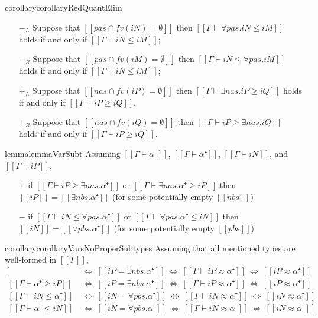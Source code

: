 \begin{restatable}{corollary}{corollaryRedQuantElim}
    \label{corollary:red-quant-elim}
    \hfill
    \begin{itemize}
        \item [$-_{L}$] Suppose that $[[ {pas} ∩ fv(iN) = ∅]]$ then 
            $[[Γ ⊢ ∀pas.iN ≤ iM]]$ holds if and only if $[[Γ ⊢ iN ≤ iM]]$;
        \item [$-_{R}$] Suppose that $[[ {pas} ∩ fv(iM) = ∅]]$ then 
            $[[Γ ⊢ iN ≤ ∀pas.iM]]$ holds if and only if $[[Γ ⊢ iN ≤ iM]]$;
        \item [$+_{L}$] Suppose that $[[ {nas} ∩ fv(iP) = ∅]]$ then
            $[[Γ ⊢ ∃nas.iP ≥ iQ]]$ holds if and only if $[[Γ ⊢ iP ≥ iQ]]$.
        \item [$+_{R}$] Suppose that $[[ {nas} ∩ fv(iQ) = ∅]]$ then 
            $[[Γ ⊢ iP ≥ ∃nas.iQ]]$ holds if and only if $[[Γ ⊢ iP ≥ iQ]]$.
    \end{itemize}
\end{restatable}

\begin{restatable}{lemma}{lemmaVarSubt}
    \label{lemma:var-subt}
    Assuming $[[Γ ⊢  α⁻]]$, $[[Γ ⊢ α⁺]]$, $[[Γ ⊢ iN]]$, and $[[Γ ⊢ iP]]$,
    \begin{itemize}
    \item[$+$] if $[[Γ ⊢ iP ≥ ∃nas.α⁺]]$ or $[[Γ ⊢ ∃nas.α⁺ ≥ iP ]]$ then $[[iP]] = [[∃nbs.α⁺]]$ (for some potentially empty $[[nbs]]$)
    \item[$-$] if $[[Γ ⊢ iN ≤ ∀pas.α⁻]]$ or $[[Γ ⊢ ∀pas.α⁻ ≤ iN ]]$ then $[[iN]] = [[∀pbs.α⁻]]$ (for some potentially empty $[[pbs]]$)
    \end{itemize}
\end{restatable}

\begin{restatable}{corollary}{corollaryVarsNoProperSubtypes}
    \label{corollary:vars-no-proper-subtypes}
    Assuming that all mentioned types are well-formed in $[[Γ]]$,
    \begin{align*}
        [[Γ ⊢ iP ≥ α⁺]] ~ &\iff ~ [[iP = ∃nbs.α⁺]]  ~ \iff ~ [[Γ ⊢ iP ≈ α⁺]] ~ \iff ~ [[iP ≈ α⁺]]\\
        [[Γ ⊢ α⁺≥ iP]]  ~ &\iff ~ [[iP = ∃nbs.α⁺]]  ~ \iff ~ [[Γ ⊢ iP ≈ α⁺]] ~ \iff ~ [[iP ≈ α⁺]]\\
        [[Γ ⊢ iN ≤ α⁻]] ~ &\iff ~ [[iN = ∀pbs.α⁻]]  ~ \iff ~ [[Γ ⊢ iN ≈ α⁻]] ~ \iff ~ [[iN ≈ α⁻]]\\
        [[Γ ⊢ α⁻ ≤ iN]] ~ &\iff ~ [[iN = ∀pbs.α⁻]]  ~ \iff ~ [[Γ ⊢ iN ≈ α⁻]] ~ \iff ~ [[iN ≈ α⁻]]\\
    \end{align*}
\end{restatable}


